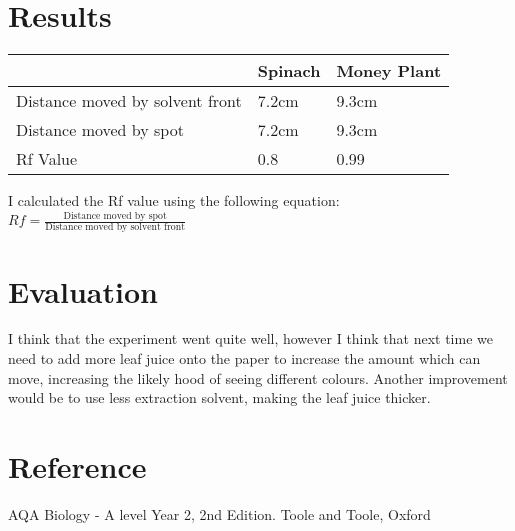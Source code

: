 \documentclass{thomasClass}
\begin{document}
\section{Results}
\begin{table}[H]
    \centering
    \begin{tabularx}{0.8\textwidth}{X|XX}
         & Spinach & Money Plant \\
        \hline
        Distance moved by solvent front & 7.2cm & 9.3cm \\
        Distance moved by spot & 7.2cm & 9.3cm \\
        Rf Value & 0.8 & 0.99
    \end{tabularx}
\end{table}
I calculated the Rf value using the following equation:
$Rf = \frac{\mbox{Distance moved by spot}}{\mbox{Distance moved by solvent front}} $

\section{Evaluation}
I think that the experiment went quite well, however I think that next time we need to add more leaf juice onto the paper to increase the amount which can move, increasing the likely hood of seeing different colours. Another improvement would be to use less extraction solvent, making the leaf juice thicker.

\section{Reference}
AQA Biology - A level Year 2, 2nd Edition. Toole and Toole, Oxford
\end{document}
